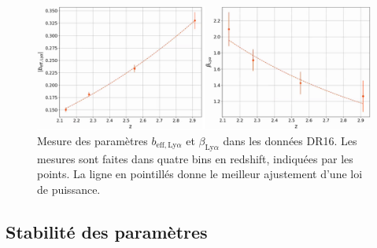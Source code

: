 \begin{figure}
  \centering
  \includegraphics[scale=0.44]{bias_vs_z}
  \caption{Mesure des paramètres $b_{\mathrm{eff},\mathrm{Ly}\alpha}$ et $\beta_{\mathrm{Ly}\alpha}$ dans les données DR16. Les mesures sont faites dans quatre bins en redshift, indiquées par les points. La ligne en pointillés donne le meilleur ajustement d'une loi de puissance.}
  \label{fig:bias_vs_z}
\end{figure}





\subsection{Stabilité des paramètres \lya{}}
\label{subsec:stab_pars_lya}


